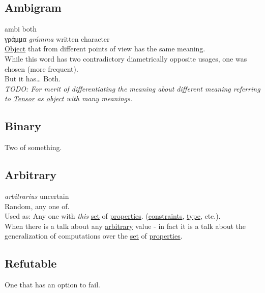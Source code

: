\documentclass[a4paper,14pt,oneside]{book}
\begin{document}
\subsection{\label{org55c5677}Ambigram}
\label{sec:orgd0e8266}
ambi both\\
γράμμα \emph{grámma} written character\\

\hyperref[org65d2cb0]{Object} that from different points of view has the same meaning.\\

While this word has two contradictory diametrically opposite usages, one was chosen (more frequent).\\

But it has\ldots{} Both.\\

\emph{TODO: For merit of differentiating the meaning about different meaning referring to \hyperref[org2b0aeb4]{Tensor} as \hyperref[org65d2cb0]{object} with many meanings.}\\

\subsection{\label{orga442c45}Binary}
\label{sec:orgd1c82bd}
Two of something.\\

\subsection{\label{orgdcbda01}Arbitrary}
\label{sec:orgc71cc55}
\emph{arbitrarius} uncertain\\

Random, any one of.\\

Used as: Any one with \emph{this} \hyperref[orgc6fbcf3]{set} of \hyperref[orge0a1a8a]{properties}. (\hyperref[org7ed1207]{constraints}, \hyperref[org35b9249]{type}, etc.).\\

When there is a talk about any \hyperref[orgdcbda01]{arbitrary} value - in fact it is a talk about the generalization of computations over the \hyperref[orgc6fbcf3]{set} of \hyperref[orge0a1a8a]{properties}.\\

\subsection{\label{orgf77c517}Refutable}
\label{sec:orgefe8b2a}
One that has an option to fail.\\
\end{document}
